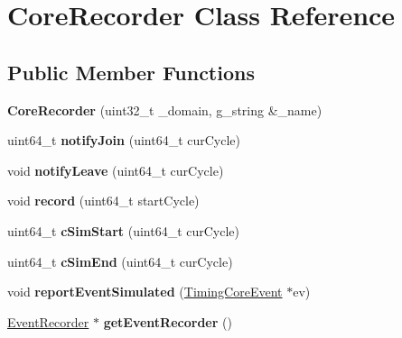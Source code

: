 \hypertarget{classCoreRecorder}{\section{Core\-Recorder Class Reference}
\label{classCoreRecorder}
}
\subsection*{Public Member Functions}
\begin{DoxyCompactItemize}
\item 
\hypertarget{classCoreRecorder_a9817e576d86284d031cfdde850421465}{{\bfseries Core\-Recorder} (uint32\-\_\-t \-\_\-domain, g\-\_\-string \&\-\_\-name)}\label{classCoreRecorder_a9817e576d86284d031cfdde850421465}

\item 
\hypertarget{classCoreRecorder_a75258d05bd878d2c24692ea126fa0fca}{uint64\-\_\-t {\bfseries notify\-Join} (uint64\-\_\-t cur\-Cycle)}\label{classCoreRecorder_a75258d05bd878d2c24692ea126fa0fca}

\item 
\hypertarget{classCoreRecorder_a5de90ebbe596f875c59b876c25ac5e4e}{void {\bfseries notify\-Leave} (uint64\-\_\-t cur\-Cycle)}\label{classCoreRecorder_a5de90ebbe596f875c59b876c25ac5e4e}

\item 
\hypertarget{classCoreRecorder_a6bb5ab211da547753d433832c30324f3}{void {\bfseries record} (uint64\-\_\-t start\-Cycle)}\label{classCoreRecorder_a6bb5ab211da547753d433832c30324f3}

\item 
\hypertarget{classCoreRecorder_a3b68c6854d37e643982f1111d4244e9f}{uint64\-\_\-t {\bfseries c\-Sim\-Start} (uint64\-\_\-t cur\-Cycle)}\label{classCoreRecorder_a3b68c6854d37e643982f1111d4244e9f}

\item 
\hypertarget{classCoreRecorder_ac09b4e16164bce69aa47bda2e406b61d}{uint64\-\_\-t {\bfseries c\-Sim\-End} (uint64\-\_\-t cur\-Cycle)}\label{classCoreRecorder_ac09b4e16164bce69aa47bda2e406b61d}

\item 
\hypertarget{classCoreRecorder_a225bf52a8b8655954392caa90a2ae5df}{void {\bfseries report\-Event\-Simulated} (\hyperlink{classTimingCoreEvent}{Timing\-Core\-Event} $\ast$ev)}\label{classCoreRecorder_a225bf52a8b8655954392caa90a2ae5df}

\item 
\hypertarget{classCoreRecorder_a2d23b6db5507453886f42deee7150994}{\hyperlink{classEventRecorder}{Event\-Recorder} $\ast$ {\bfseries get\-Event\-Recorder} ()}\label{classCoreRecorder_a2d23b6db5507453886f42deee7150994}


\end{DoxyCompactItemize}

